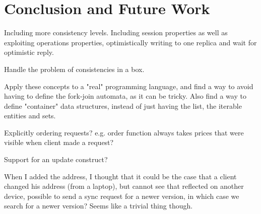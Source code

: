 
\section{Conclusion and Future Work}

Including more consistency levels. Including session properties as well as exploiting operations properties, optimistically writing to one replica and wait for 
optimistic reply.

Handle the problem of consistencies in a box.

Apply these concepts to a "real" programming language, and find a way to avoid
having to define the fork-join automata, as it can be tricky. Also find a way to
define "container" data structures, instead of just having the list, the
iterable entities and sets.

Explicitly ordering requests? e.g. order function always takes prices that were
visible when client made a request?


Support for an update construct?

When I added the address, I thought that it could be the case that a client
changed his address (from a laptop), but cannot see that reflected on another
device, possible to send a sync request for a newer version, in which case we
search for a newer version? Seems like a trivial thing though.
